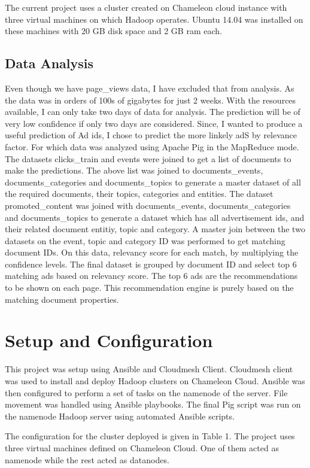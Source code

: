 \documentclass[9pt,twocolumn,twoside]{../../styles/osajnl}
\begin{document}
The current project uses a cluster created on Chameleon cloud instance with three virtual machines on which Hadoop operates. Ubuntu 14.04 was installed on these machines with 20 GB disk space and 2 GB ram each.

\subsection{Data Analysis}
Even though we have page\_views data, I have excluded that from analysis. As the data was in orders of 100s of gigabytes for just 2 weeks. With the resources available, I can only take two days of data for analysis. The prediction will be of very low confidence if only two days are considered. Since, I wanted to produce a useful prediction of Ad ids, I chose to predict the more linkely adS by relevance factor. For which data was analyzed using Apache Pig in the MapReduce mode. The datasets clicks\_train and events were joined to get a list of documents to make the predictions. The above list was joined to documents\_events, documents\_categories and documents\_topics to generate a master dataset of all the required documents, their topics, categories and entities. The dataset promoted\_content was joined with documents\_events, documents\_categories and documents\_topics to generate a dataset which has all advertisement ids, and their related document entitiy, topic and category. A master join between the two datasets on the event, topic and category ID was performed to get matching document IDs. On this data, relevancy score for each match, by multiplying the confidence levels. The final dataset is grouped by document ID and select top 6 matching ads based on relevancy score. The top 6 ads are the recommendations to be shown on each page. This recommendation engine is purely based on the matching document properties.

\section{Setup and Configuration}
This project was setup using Ansible and Cloudmesh Client. Cloudmesh client was used to install and deploy Hadoop clusters on Chameleon Cloud. Ansible was then configured to perform a set of tasks on the namenode of the server. File movement was handled using Ansible playbooks. The final Pig script was run on the namenode Hadoop server using automated Ansible scripts.

The configuration for the cluster deployed is given in Table 1. The project uses three virtual machines defined on Chameleon Cloud. One of them acted as namenode while the rest acted as datanodes. 
\end{document}
